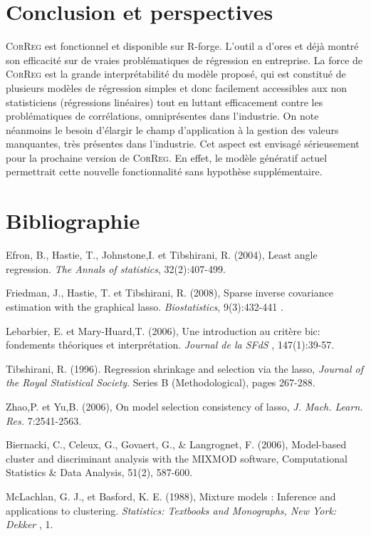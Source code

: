 \documentclass[12pt]{article}
\begin{document}
\section{Conclusion et perspectives}
	\textsc{CorReg} est fonctionnel et disponible sur R-forge. L'outil a d'ores et déjà montré son efficacité sur de vraies problématiques de régression en entreprise.
	La force de \textsc{CorReg} est la grande interprétabilité du modèle proposé, qui est constitué de plusieurs modèles de régression simples et donc facilement accessibles aux non statisticiens (régressions linéaires) tout en luttant efficacement contre les problématiques de corrélations, omniprésentes dans l'industrie.
	On note néanmoins le besoin d'élargir le champ d'application à la gestion des valeurs manquantes, très présentes dans l'industrie. Cet aspect est envisagé sérieusement pour la prochaine version de \textsc{CorReg}. En effet, le modèle génératif actuel permettrait cette nouvelle fonctionnalité sans hypothèse supplémentaire.
	

\section*{Bibliographie}
%

\noindent [1] Efron, B., Hastie, T., Johnstone,I. et Tibshirani, R. (2004), Least angle regression. {\it The
Annals of statistics}, 32(2):407-499.

\noindent [2] Friedman, J., Hastie, T. et Tibshirani, R. (2008), Sparse inverse covariance estimation with
the graphical lasso.  {\it Biostatistics}, 9(3):432-441 .

\noindent [3] Lebarbier, E. et Mary-Huard,T. (2006), Une introduction au critère bic: fondements
théoriques et interprétation.  {\it Journal de la SFdS }, 147(1):39-57.

\noindent[4] Tibshirani, R. (1996). Regression shrinkage and selection via the lasso,  {\it Journal of the Royal
Statistical Society}. Series B (Methodological), pages 267-288.

\noindent [5] Zhao,P. et Yu,B. (2006), On model selection consistency of lasso, {\it J. Mach. Learn.
Res.} 7:2541-2563.

\noindent [6] Biernacki, C., Celeux, G., Govaert, G., \& Langrognet, F. (2006), Model-based cluster and discriminant analysis with the MIXMOD software, Computational Statistics \& Data Analysis, 51(2), 587-600.

\noindent [7] McLachlan, G. J., et Basford, K. E. (1988), Mixture models : Inference and applications to clustering. {\it Statistics: Textbooks and Monographs, New York: Dekker }, 1.

%
%
%
\end{document}
